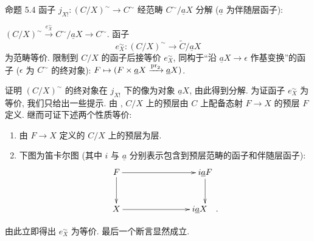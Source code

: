 \begin{enonce*}{命题 5.4}
函子 $j_{X!}:(C/X)^{\sim}\rightarrow C^{\sim}$ 经范畴
$C^{\sim}/\underline{a}X$ 分解 ($\underline{a}$ 为伴随层函子):

$(C/X)^{\sim}\xrightarrow{e^{\sim}_X} C^{\sim}/\underline{a}X\rightarrow C^{\sim}$.
函子
$$
e^{\sim}_X:(C/X)^{\sim}\longrightarrow \widetilde{C}/\underline{a}X
$$
为范畴等价. 限制到 $C/X$ 的函子后接等价 $e^{\sim}_X$,
同构于“沿 $\underline{a}X\rightarrow \epsilon$ 作基变换”的函子
($\epsilon$ 为 $C^{\sim}$ 的终对象):
$F\mapsto (F\times \underline{a}X\xrightarrow{\operatorname{pr}_2}\underline{a}X)$.
\end{enonce*}

\begin{enonce*}[remark]{证明}
$(C/X)^{\sim}$ 的终对象在 $j_{X!}$ 下的像为对象 $\underline{a}X$,
由此得到分解. 为证函子 $e^{\sim}_X$ 为等价, 我们只给出一些提示.
由 , $C/X$ 上的预层由
$C$ 上配备态射 $F\rightarrow X$ 的预层 $F$ 定义.
继而可证下述两个性质等价:
\begin{enumerate}
\renewcommand{\theenumi}{\roman{enumi}}
\renewcommand{\labelenumi}{\theenumi)}
\item 由 $F\rightarrow X$ 定义的 $C/X$ 上的预层为层.

\item 下图为笛卡尔图 (其中 $i$ 与 $\underline{a}$ 分别表示包含到预层范畴的函子和伴随层函子):
\[
\xymatrix@C=2.75cm@R=1cm{
F \ar[r]\ar[d]& i\mathsf{\underline{a}}F \ar[d]\\
X \ar[r]& i\mathsf{\underline{a}}X\quad . }
\]
\end{enumerate}

由此\pageoriginale{}立即得出 $e^{\sim}_X$ 为等价. 最后一个断言显然成立.
\end{enonce*}


